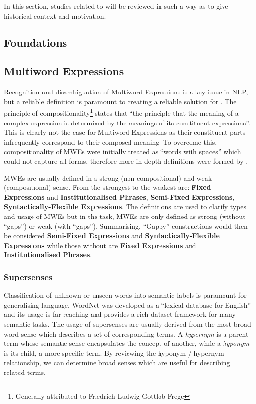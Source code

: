 In this section, studies related to \dimsum will be reviewed in such a way as to give historical context and motivation. 

\subsection{Foundations}
\subsection{Multiword Expressions}\label{mwe}

Recognition and disambiguation of Multiword Expressions is a key issue in NLP, but a reliable definition is paramount to creating a reliable solution for \dimsum. The principle of compositionality\footnote{Generally attributed to Friedrich Ludwig Gottlob Frege} states that ``the principle that the meaning of a complex expression is determined by the meanings of its constituent expressions''\cite{wiki:Principle_of_compositionality}. This is clearly not the case for Multiword Expressions as their constituent parts infrequently correspond to their composed meaning. To overcome this, compositionality of MWEs were initially treated as ``words with spaces'' which could not capture all forms, therefore more in depth definitions were formed by \cite{Sag2002}. 

MWEs are usually defined in a strong (non-compositional) and weak (compositional) sense. From the strongest to the weakest are: {\bf Fixed Expressions} and {\bf Institutionalised Phrases},  {\bf Semi-Fixed Expressions},  {\bf Syntactically-Flexible Expressions}. The definitions are used to clarify types and usage of MWEs but in the \dimsum task, MWEs are only defined as strong (without ``gaps'') or weak (with ``gaps''). Summarising, ``Gappy'' constructions would then be considered {\bf Semi-Fixed Expressions} and {\bf Syntactically-Flexible Expressions} while those without are {\bf Fixed Expressions} and {\bf Institutionalised Phrases}.

\subsubsection{Supersenses}\label{supersenses}
Classification of unknown or unseen words into semantic labels is paramount for generalising language. WordNet was developed as a ``lexical database for English''\cite{Miller1995} and its usage is far reaching and provides a rich dataset framework for many semantic tasks. The usage of supersenses are usually derived from the most broad word sense which describes a set of corresponding terms. A {\it hypernym} is a parent term whose semantic sense encapsulates the concept of another, while a {\it hyponym} is its child, a more specific term. By reviewing the hyponym / hypernym relationship, we can determine broad senses which are useful for describing related terms. 

